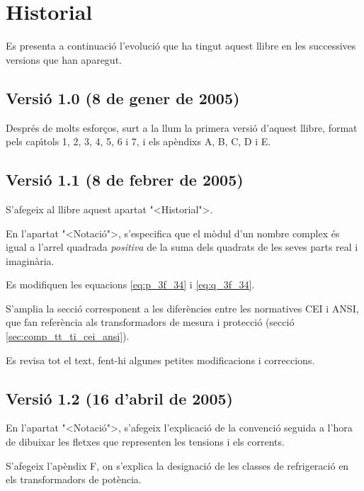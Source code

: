 \chapter*{Historial}

Es presenta a continuaci\'{o} l'evoluci\'{o} que ha tingut aquest llibre en
les successives versions que han aparegut.

\section*{Versi\'{o} 1.0 (8 de gener de 2005)}

Despr\'{e}s de molts esfor\c{c}os, surt a la llum la primera versi\'{o} d'aquest
llibre, format pels cap\'{\i}tols 1, 2, 3, 4, 5, 6 i 7, i els ap\`{e}ndixs A,
B, C, D i E.

\section*{Versi\'{o} 1.1 (8 de febrer de 2005)}

S'afegeix al llibre aquest apartat {"<}Historial{">}.

En l'apartat {"<}Notaci\'{o}{">}, s'especifica que el m\`{o}dul d'un nombre
complex \'{e}s igual a l'arrel quadrada \emph{positiva} de la suma dels
quadrats de les seves parts real i imagin\`{a}ria.

Es modifiquen les equacions \eqref{eq:p_3f_34} i \eqref{eq:q_3f_34}.

S'amplia la secci\'{o} corresponent a les difer\`{e}ncies entre les
normatives \textsf{CEI} i \textsf{ANSI}, que fan refer\`{e}ncia als
transformadors de mesura i protecci\'{o} (secci\'{o}
\ref{sec:comp_tt_ti_cei_ansi}).

Es revisa tot el text, fent-hi algunes petites modificacions i
correccions.

\section*{Versi\'{o} 1.2 (16 d'abril de 2005)}

En l'apartat {"<}Notaci\'{o}{">}, s'afegeix l'explicaci\'{o} de la convenci\'{o}
seguida a l'hora de dibuixar les fletxes que representen les
tensions i els corrents.

S'afegeix l'ap\`{e}ndix F, on s'explica la designaci\'{o} de les classes de
refrigeraci\'{o} en els transformadors de pot\`{e}ncia.

